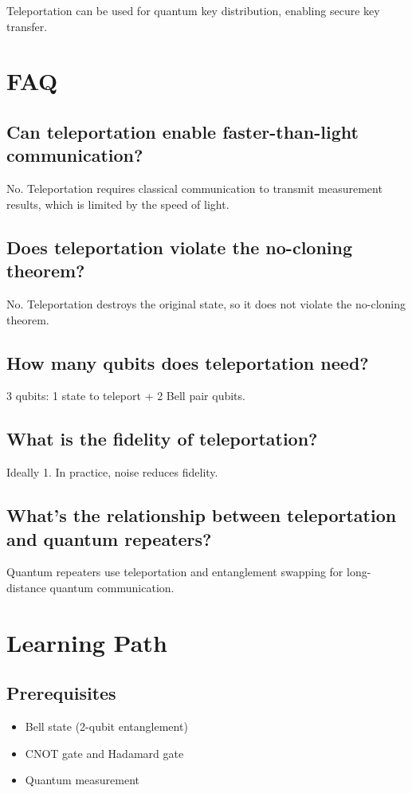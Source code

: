 \documentclass[12pt,a4paper]{article}
\begin{document}
Teleportation can be used for quantum key distribution, enabling secure key transfer.

\section{FAQ}

\subsection{Can teleportation enable faster-than-light communication?}

No. Teleportation requires classical communication to transmit measurement results, which is limited by the speed of light.

\subsection{Does teleportation violate the no-cloning theorem?}

No. Teleportation destroys the original state, so it does not violate the no-cloning theorem.

\subsection{How many qubits does teleportation need?}

3 qubits: 1 state to teleport + 2 Bell pair qubits.

\subsection{What is the fidelity of teleportation?}

Ideally 1. In practice, noise reduces fidelity.

\subsection{What's the relationship between teleportation and quantum repeaters?}

Quantum repeaters use teleportation and entanglement swapping for long-distance quantum communication.

\section{Learning Path}

\subsection{Prerequisites}
\begin{itemize}
  \item Bell state (2-qubit entanglement)
  \item CNOT gate and Hadamard gate
  \item Quantum measurement
\end{itemize}
\end{document}
